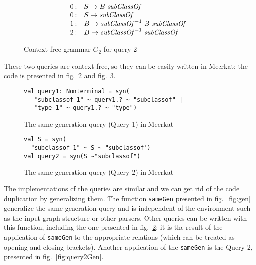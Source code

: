 \begin{figure}[h]
   \centering
   \[
\begin{array}{rl}
   0: & S \rightarrow B \ \text{\textit{subClassOf}} \\
   0: & S \rightarrow \text{\textit{subClassOf}} \\
   1: & B \rightarrow \text{\textit{subClassOf}}^{-1} \ B \ \text{\textit{subClassOf}} \\
   2: & B \rightarrow \text{\textit{subClassOf}}^{-1} \ \text{\textit{subClassOf}} \\
\end{array}
\]
   \caption{Context-free grammar $G_2$ for query 2}
   \label{grammarQ2}
   \end{figure}

   These two queries are context-free, so they can be easily written in Meerkat: the code is presented in fig.~\ref{fig:query1Meerkat} and fig.~\ref{fig:query2Meerkat}.

\begin{figure}[h]
\begin{lstlisting}
val query1: Nonterminal = syn(
   "subclassof-1" ~ query1.? ~ "subclassof" |
   "type-1" ~ query1.? ~ "type")
\end{lstlisting}
\caption{The same generation query (Query 1) in Meerkat}
\label{fig:query1Meerkat}
\end{figure}


\begin{figure}[h]
\begin{lstlisting}
val S = syn(
  "subclassof-1" ~ S ~ "subclassof")
val query2 = syn(S ~"subclassof")
\end{lstlisting}
\caption{The same generation query (Query 2) in Meerkat}
\label{fig:query2Meerkat}
\end{figure}

The implementations of the queries are similar and we can get rid of the code duplication by generalizing them. 
The function \lstinline{sameGen} presented in fig.~\ref{fig:gen} generalize the same generation query and is independent of the environment such as the input graph structure or other parsers.
Other queries can be written with this function, including the one presented in fig.~\ref{fig:query1Meerkat}: it is the result of the application of \lstinline{sameGen} to the appropriate relations (which can be treated as opening and closing brackets).
Another application of the \lstinline{sameGen} is the Query 2, presented in fig.~\ref{fig:query2Gen}.

